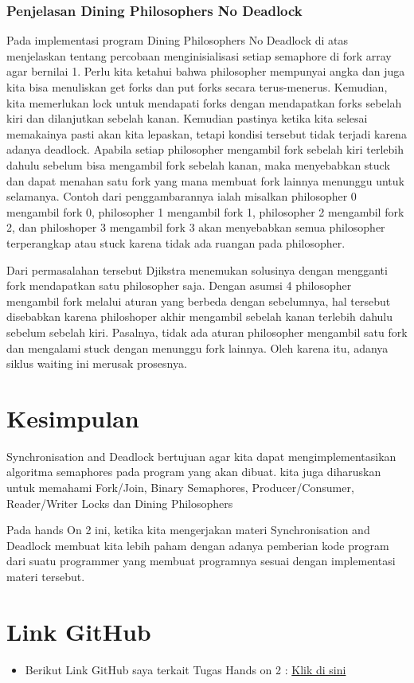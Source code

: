 \documentclass[11pt,a4paper]{article}
\begin{document}
\subsubsection{\textbf{Penjelasan Dining Philosophers No Deadlock}}
Pada implementasi program Dining Philosophers No Deadlock di atas menjelaskan tentang percobaan menginisialisasi setiap semaphore di fork array agar bernilai 1. Perlu kita ketahui bahwa philosopher mempunyai angka dan juga kita bisa menuliskan get forks dan put forks secara terus-menerus. Kemudian, kita memerlukan lock untuk mendapati forks dengan mendapatkan forks sebelah kiri dan dilanjutkan sebelah kanan. Kemudian pastinya ketika kita selesai memakainya pasti akan kita lepaskan, tetapi kondisi tersebut tidak terjadi karena adanya deadlock. Apabila setiap philosopher mengambil fork sebelah kiri terlebih dahulu sebelum bisa mengambil fork sebelah kanan, maka menyebabkan stuck dan dapat menahan satu fork yang mana membuat fork lainnya menunggu untuk selamanya. Contoh dari penggambarannya ialah misalkan philosopher 0 mengambil fork 0, philosopher 1 mengambil fork 1, philosopher 2 mengambil fork 2, dan philoshoper 3 mengambil fork 3 akan menyebabkan semua philosopher terperangkap atau stuck karena tidak ada ruangan pada philosopher. 

Dari permasalahan tersebut Djikstra menemukan solusinya dengan mengganti fork mendapatkan satu philosopher saja. Dengan asumsi 4 philosopher mengambil fork melalui aturan yang berbeda dengan sebelumnya, hal tersebut disebabkan karena philoshoper akhir mengambil sebelah kanan terlebih dahulu sebelum sebelah kiri. Pasalnya, tidak ada aturan philosopher mengambil satu fork dan mengalami stuck dengan menunggu fork lainnya. Oleh karena itu, adanya siklus waiting ini merusak prosesnya.

\newpage
\section{Kesimpulan}
    Synchronisation and Deadlock bertujuan agar kita dapat mengimplementasikan algoritma semaphores pada program yang akan dibuat. kita juga diharuskan untuk memahami Fork/Join, Binary Semaphores, Producer/Consumer, Reader/Writer Locks dan Dining Philosophers
    
    Pada hands On 2 ini, ketika kita mengerjakan materi Synchronisation and Deadlock membuat kita lebih paham dengan adanya pemberian kode program dari suatu programmer yang membuat programnya sesuai dengan implementasi materi tersebut. 
    
\newpage
\section{Link GitHub }
\begin{itemize}
\item Berikut Link GitHub saya terkait Tugas Hands on 2 :
    \href{https://github.com/zointarasbangun/Sistem-Operasi}{Klik di sini}
     \end{itemize}
     
\end{document}
